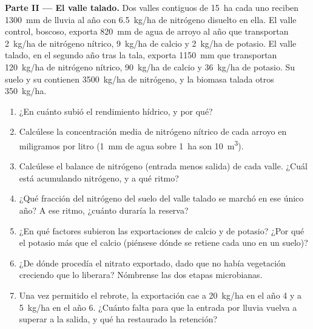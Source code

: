 \begin{problem}
\medskip
\noindent\textbf{Parte II --- El valle talado.}
Dos valles contiguos de \qty{15}{ha} cada uno reciben \qty{1300}{mm} de
lluvia al año con \qty{6.5}{kg/ha} de nitrógeno disuelto en ella. El valle
control, boscoso, exporta \qty{820}{mm} de agua de arroyo al año que
transportan \qty{2}{kg/ha} de nitrógeno nítrico, \qty{9}{kg/ha} de calcio y
\qty{2}{kg/ha} de potasio. El valle talado, en el segundo año tras la tala,
exporta \qty{1150}{mm} que transportan \qty{120}{kg/ha} de nitrógeno
nítrico, \qty{90}{kg/ha} de calcio y \qty{36}{kg/ha} de potasio. Su suelo y
su  contienen \qty{3500}{kg/ha} de nitrógeno, y la biomasa talada
otros \qty{350}{kg/ha}.
\begin{enumerate}[resume]
  \item ¿En cuánto subió el rendimiento hídrico, y por qué?
  \item Calcúlese la concentración media de nitrógeno nítrico de cada arroyo
        en miligramos por litro (\qty{1}{mm} de agua sobre \qty{1}{ha} son
        \qty{10}{m^3}).
  \item Calcúlese el balance de nitrógeno (entrada menos salida) de cada
        valle. ¿Cuál está acumulando nitrógeno, y a qué ritmo?
  \item ¿Qué fracción del nitrógeno del suelo del valle talado se marchó en
        ese único año? A ese ritmo, ¿cuánto duraría la reserva?
  \item ¿En qué factores subieron las exportaciones de calcio y de potasio?
        ¿Por qué el potasio más que el calcio (piénsese dónde se retiene
        cada uno en un suelo)?
  \item ¿De dónde procedía el nitrato exportado, dado que no había
        vegetación creciendo que lo liberara? Nómbrense las dos etapas
        microbianas.
  \item Una vez permitido el rebrote, la exportación cae a \qty{20}{kg/ha}
        en el año 4 y a \qty{5}{kg/ha} en el año 6. ¿Cuánto falta para que
        la entrada por lluvia vuelva a superar a la salida, y qué ha
        restaurado la retención?
\end{enumerate}


\end{problem}

